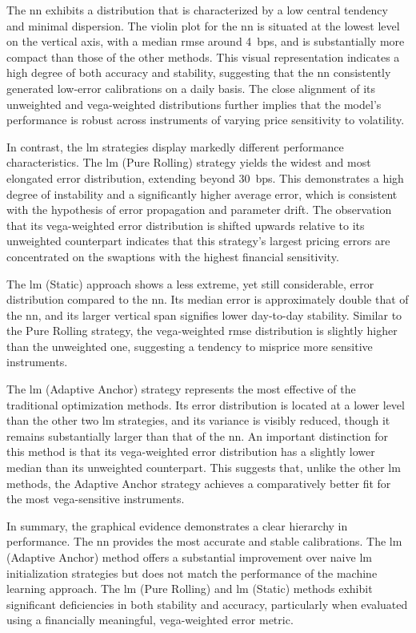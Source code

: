 The \ac{nn} exhibits a distribution that is characterized by a low central tendency and minimal dispersion. The violin plot for the \ac{nn} is situated at the lowest level on the vertical axis, with a median \ac{rmse} around 4~\ac{bps}, and is substantially more compact than those of the other methods. This visual representation indicates a high degree of both accuracy and stability, suggesting that the \ac{nn} consistently generated low-error calibrations on a daily basis. The close alignment of its unweighted and vega-weighted distributions further implies that the model's performance is robust across instruments of varying price sensitivity to volatility.

In contrast, the \ac{lm} strategies display markedly different performance characteristics. The \ac{lm} (Pure Rolling) strategy yields the widest and most elongated error distribution, extending beyond 30~\ac{bps}. This demonstrates a high degree of instability and a significantly higher average error, which is consistent with the hypothesis of error propagation and parameter drift. The observation that its vega-weighted error distribution is shifted upwards relative to its unweighted counterpart indicates that this strategy's largest pricing errors are concentrated on the swaptions with the highest financial sensitivity.

The \ac{lm} (Static) approach shows a less extreme, yet still considerable, error distribution compared to the \ac{nn}. Its median error is approximately double that of the \ac{nn}, and its larger vertical span signifies lower day-to-day stability. Similar to the Pure Rolling strategy, the vega-weighted \ac{rmse} distribution is slightly higher than the unweighted one, suggesting a tendency to misprice more sensitive instruments.

The \ac{lm} (Adaptive Anchor) strategy represents the most effective of the traditional optimization methods. Its error distribution is located at a lower level than the other two \ac{lm} strategies, and its variance is visibly reduced, though it remains substantially larger than that of the \ac{nn}. An important distinction for this method is that its vega-weighted error distribution has a slightly lower median than its unweighted counterpart. This suggests that, unlike the other \ac{lm} methods, the Adaptive Anchor strategy achieves a comparatively better fit for the most vega-sensitive instruments.

In summary, the graphical evidence demonstrates a clear hierarchy in performance. The \ac{nn} provides the most accurate and stable calibrations. The \ac{lm} (Adaptive Anchor) method offers a substantial improvement over naive \ac{lm} initialization strategies but does not match the performance of the machine learning approach. The \ac{lm} (Pure Rolling) and \ac{lm} (Static) methods exhibit significant deficiencies in both stability and accuracy, particularly when evaluated using a financially meaningful, vega-weighted error metric.

